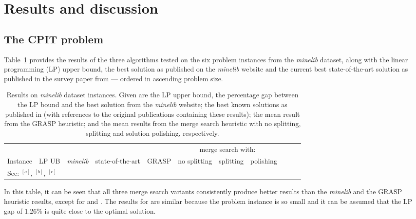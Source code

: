\documentclass[preprint]{elsarticle}
\begin{document}
\section{Results and discussion}\label{sec:results}
\subsection{The CPIT problem}

Table~\ref{tab:mine:main} provides the results of the three algorithms tested on the six problem instances from the \emph{minelib} dataset, along with the linear programming (LP) upper bound, the best solution as published on the \emph{minelib} website and the current best state-of-the-art solution as published in the survey paper from \citet{minelib-improved} --- ordered in ascending problem size.

\begin{table}[h]
\centering
\caption[Results on \emph{minelib} dataset instances]{Results on \emph{minelib} dataset instances. Given are the LP upper bound, the percentage gap between the LP bound and the best solution from the \emph{minelib} website; the best known solutions as published in \citet{minelib-improved} (with references to the original publications containing these results); the mean result from the GRASP heuristic; and the mean results from the merge search heuristic with no splitting, splitting and solution polishing, respectively.
}\label{tab:mine:main}
\begin{adjustbox}{width=\textwidth}
\begin{tabular}{lrrrrrrrrrr} \toprule
 & & & & & \multicolumn{3}{c}{merge search with:}\\
\cmidrule(lr){6-8}
Instance & \multicolumn{1}{c}{LP UB} & \multicolumn{1}{c}{\emph{minelib}} & \multicolumn{1}{c}{state-of-the-art}&\multicolumn{1}{c}{GRASP}&\multicolumn{1}{c}{no splitting} & \multicolumn{1}{c}{splitting}&\multicolumn{1}{c}{polishing}  \\ \midrule
%

%
\bottomrule
\multicolumn{8}{l}{See: $^{[a]}$\citet{newman-improved}, $^{[b]}$\citet{zuck-small-improved}, $^{[c]}$\citet{aggregate}}
\end{tabular}
\end{adjustbox}
\end{table}

In this table, it can be seen that all three merge search variants consistently produce better results than the \emph{minelib} and the GRASP heuristic results, except for \newman{} and \zucklarge{}. The results for \newman{} are similar because the problem instance is so small and it can be assumed that the LP gap of 1.26\% is quite close to the optimal solution.
\end{document}
